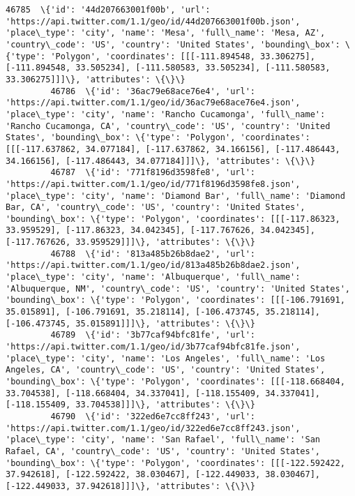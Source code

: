 \documentclass[11pt]{article}
\begin{document}
\begin{Verbatim}[commandchars=\\\{\}]
         46785  \{'id': '44d207663001f00b', 'url': 'https://api.twitter.com/1.1/geo/id/44d207663001f00b.json', 'place\_type': 'city', 'name': 'Mesa', 'full\_name': 'Mesa, AZ', 'country\_code': 'US', 'country': 'United States', 'bounding\_box': \{'type': 'Polygon', 'coordinates': [[[-111.894548, 33.306275], [-111.894548, 33.505234], [-111.580583, 33.505234], [-111.580583, 33.306275]]]\}, 'attributes': \{\}\}                           
         46786  \{'id': '36ac79e68ace76e4', 'url': 'https://api.twitter.com/1.1/geo/id/36ac79e68ace76e4.json', 'place\_type': 'city', 'name': 'Rancho Cucamonga', 'full\_name': 'Rancho Cucamonga, CA', 'country\_code': 'US', 'country': 'United States', 'bounding\_box': \{'type': 'Polygon', 'coordinates': [[[-117.637862, 34.077184], [-117.637862, 34.166156], [-117.486443, 34.166156], [-117.486443, 34.077184]]]\}, 'attributes': \{\}\}   
         46787  \{'id': '771f8196d3598fe8', 'url': 'https://api.twitter.com/1.1/geo/id/771f8196d3598fe8.json', 'place\_type': 'city', 'name': 'Diamond Bar', 'full\_name': 'Diamond Bar, CA', 'country\_code': 'US', 'country': 'United States', 'bounding\_box': \{'type': 'Polygon', 'coordinates': [[[-117.86323, 33.959529], [-117.86323, 34.042345], [-117.767626, 34.042345], [-117.767626, 33.959529]]]\}, 'attributes': \{\}\}               
         46788  \{'id': '813a485b26b8dae2', 'url': 'https://api.twitter.com/1.1/geo/id/813a485b26b8dae2.json', 'place\_type': 'city', 'name': 'Albuquerque', 'full\_name': 'Albuquerque, NM', 'country\_code': 'US', 'country': 'United States', 'bounding\_box': \{'type': 'Polygon', 'coordinates': [[[-106.791691, 35.015891], [-106.791691, 35.218114], [-106.473745, 35.218114], [-106.473745, 35.015891]]]\}, 'attributes': \{\}\}             
         46789  \{'id': '3b77caf94bfc81fe', 'url': 'https://api.twitter.com/1.1/geo/id/3b77caf94bfc81fe.json', 'place\_type': 'city', 'name': 'Los Angeles', 'full\_name': 'Los Angeles, CA', 'country\_code': 'US', 'country': 'United States', 'bounding\_box': \{'type': 'Polygon', 'coordinates': [[[-118.668404, 33.704538], [-118.668404, 34.337041], [-118.155409, 34.337041], [-118.155409, 33.704538]]]\}, 'attributes': \{\}\}             
         46790  \{'id': '322ed6e7cc8ff243', 'url': 'https://api.twitter.com/1.1/geo/id/322ed6e7cc8ff243.json', 'place\_type': 'city', 'name': 'San Rafael', 'full\_name': 'San Rafael, CA', 'country\_code': 'US', 'country': 'United States', 'bounding\_box': \{'type': 'Polygon', 'coordinates': [[[-122.592422, 37.942618], [-122.592422, 38.030467], [-122.449033, 38.030467], [-122.449033, 37.942618]]]\}, 'attributes': \{\}\}               

\end{Verbatim}
\end{document}
